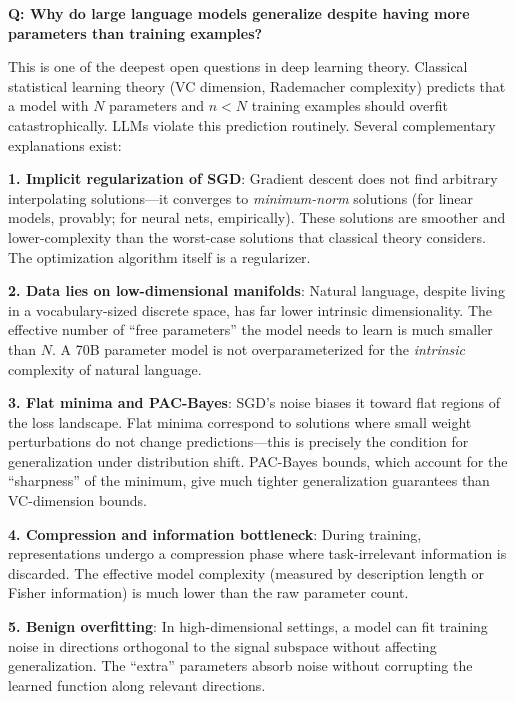 \begin{interviewq}
\textbf{Q: Why do large language models generalize despite having more parameters than training examples?}

 \quad {} \quad \badgefreq{\freqmed}

\stronganswer
This is one of the deepest open questions in deep learning theory. Classical statistical learning theory (VC dimension, Rademacher complexity) predicts that a model with $N$ parameters and $n < N$ training examples should overfit catastrophically. LLMs violate this prediction routinely. Several complementary explanations exist:

\textbf{1. Implicit regularization of SGD}: Gradient descent does not find arbitrary interpolating solutions---it converges to \textit{minimum-norm} solutions (for linear models, provably; for neural nets, empirically). These solutions are smoother and lower-complexity than the worst-case solutions that classical theory considers. The optimization algorithm itself is a regularizer.

\textbf{2. Data lies on low-dimensional manifolds}: Natural language, despite living in a vocabulary-sized discrete space, has far lower intrinsic dimensionality. The effective number of ``free parameters'' the model needs to learn is much smaller than $N$. A 70B parameter model is not overparameterized for the \textit{intrinsic} complexity of natural language.

\textbf{3. Flat minima and PAC-Bayes}: SGD's noise biases it toward flat regions of the loss landscape. Flat minima correspond to solutions where small weight perturbations do not change predictions---this is precisely the condition for generalization under distribution shift. PAC-Bayes bounds, which account for the ``sharpness'' of the minimum, give much tighter generalization guarantees than VC-dimension bounds.

\textbf{4. Compression and information bottleneck}: During training, representations undergo a compression phase where task-irrelevant information is discarded. The effective model complexity (measured by description length or Fisher information) is much lower than the raw parameter count.

\textbf{5. Benign overfitting}: In high-dimensional settings, a model can fit training noise in directions orthogonal to the signal subspace without affecting generalization. The ``extra'' parameters absorb noise without corrupting the learned function along relevant directions.


\end{interviewq}
